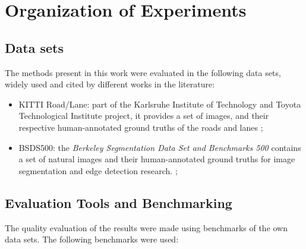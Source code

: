 \section{Organization of Experiments}

\subsection{Data sets}
\label{cap5_bases_dados}

The methods present in this work were evaluated in the following data sets, widely used and cited by different works in the literature:

\begin{itemize}
 \item KITTI Road/Lane: part of the Karlsruhe Institute of Technology and Toyota Technological Institute project, it provides a set of images, and their respective human-annotated ground truths of the roads and lanes \cite{Fritsch2013ITSC}; %

 \item BSDS500: the \textit{Berkeley Segmentation Data Set and Benchmarks 500} contains a set of natural images and their human-annotated ground truths for image segmentation and edge detection research. \cite{amfm_pami2011}; %
 
\end{itemize}

\subsection{Evaluation Tools and Benchmarking}
\label{cap5_formas_avaliacao}

The quality evaluation of the results were made using benchmarks of the own data sets. %
The following benchmarks were used:

